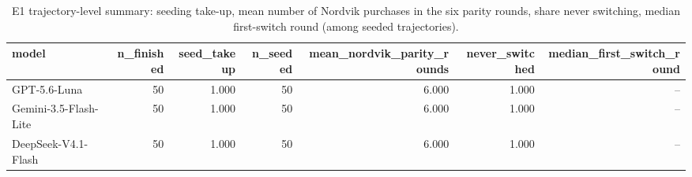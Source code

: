 \begin{table}[htbp]
\centering
\scriptsize
\caption{E1 trajectory-level summary: seeding take-up, mean number of Nordvik purchases in the six parity rounds, share never switching, median first-switch round (among seeded trajectories).}
\label{tab:tab08_e1_trajectory_summary}
\begin{tabular}{lrrrrrr}
\toprule
model & n\_finished & seed\_takeup & n\_seeded & mean\_nordvik\_parity\_rounds & never\_switched & median\_first\_switch\_round \\
\midrule
GPT-5.6-Luna & 50 & 1.000 & 50 & 6.000 & 1.000 & -- \\
Gemini-3.5-Flash-Lite & 50 & 1.000 & 50 & 6.000 & 1.000 & -- \\
DeepSeek-V4.1-Flash & 50 & 1.000 & 50 & 6.000 & 1.000 & -- \\
\bottomrule
\end{tabular}
\end{table}